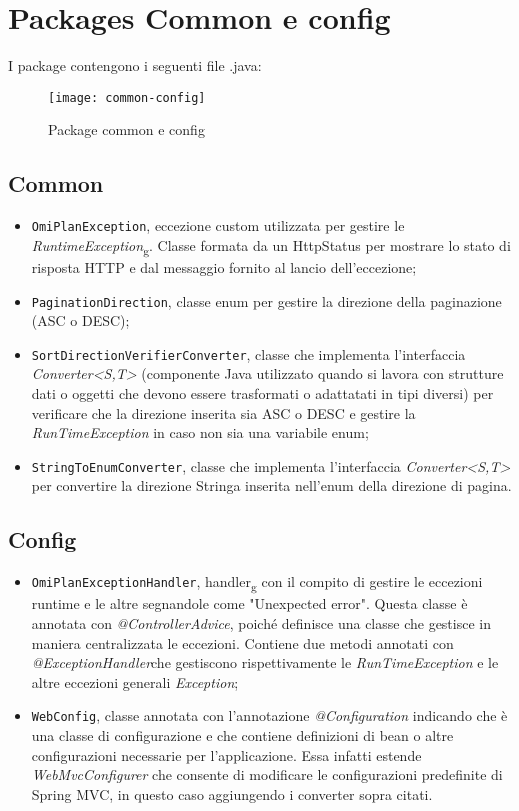 \section{Packages Common e config}
I package contengono i seguenti file .java:

\begin{figure}[H] 
    \centering 
    \texttt{[image: common-config]} 
    \caption{Package common e config}
\end{figure}
\subsection{Common}
\begin{itemize}
\item \texttt{OmiPlanException}, eccezione custom utilizzata per gestire le \textit{RuntimeException}\textsubscript{g}. Classe formata da un HttpStatus per mostrare lo stato di risposta HTTP e dal messaggio fornito al lancio dell'eccezione;
\item \texttt{PaginationDirection}, classe enum per gestire la direzione della paginazione (ASC o DESC);
\item \texttt{SortDirectionVerifierConverter}, classe che implementa l'interfaccia \textit{Converter<S,T>} (componente Java utilizzato quando si lavora con strutture dati o oggetti che devono essere trasformati o adattatati in tipi diversi) per verificare che la direzione inserita sia ASC o DESC e gestire la \textit{RunTimeException} in caso non sia una variabile enum;
\item \texttt{StringToEnumConverter}, classe che implementa l'interfaccia \textit{Converter<S,T>} per convertire la direzione Stringa inserita nell'enum della direzione di pagina.
\end{itemize}

\subsection{Config}
\begin{itemize}
\item \texttt{OmiPlanExceptionHandler}, handler\textsubscript{g} con il compito di gestire le eccezioni runtime e le altre segnandole come "Unexpected error". Questa classe è annotata con \textit{@ControllerAdvice}, poiché definisce una classe che gestisce in maniera centralizzata le eccezioni. Contiene due metodi annotati con \textit{@ExceptionHandler}che gestiscono rispettivamente le \textit{RunTimeException} e le altre eccezioni generali \textit{Exception};
\item \texttt{WebConfig}, classe annotata con l'annotazione \textit{@Configuration} indicando che è una classe di configurazione e che contiene definizioni di bean o altre configurazioni necessarie per l'applicazione. Essa infatti estende \textit{WebMvcConfigurer} che consente di modificare le configurazioni predefinite di Spring MVC, in questo caso aggiungendo i converter sopra citati.
\end{itemize}